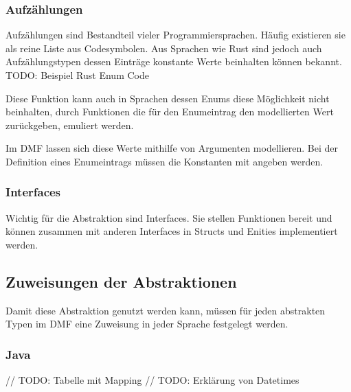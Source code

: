\documentclass[./einleitung.tex]{subfiles}
\begin{document}
\subsubsection{Aufzählungen}
Aufzählungen sind Bestandteil vieler Programmiersprachen. Häufig existieren sie als reine Liste  aus Codesymbolen. Aus Sprachen wie Rust sind jedoch auch Aufzählungstypen dessen Einträge konstante Werte beinhalten können bekannt.
TODO: Beispiel Rust Enum Code

Diese Funktion kann auch in Sprachen dessen Enums diese Möglichkeit nicht beinhalten, durch Funktionen die für den Enumeintrag den modellierten Wert zurückgeben, emuliert werden.

Im DMF lassen sich diese Werte mithilfe von Argumenten modellieren. Bei der Definition eines Enumeintrags müssen die Konstanten mit angeben werden.

\subsubsection{Interfaces}
Wichtig für die Abstraktion sind Interfaces. Sie stellen Funktionen bereit und können zusammen mit anderen Interfaces in Structs und Enities implementiert werden.


\subsection{Zuweisungen der Abstraktionen}

Damit diese Abstraktion genutzt werden kann, müssen für jeden abstrakten Typen im DMF eine Zuweisung in jeder Sprache festgelegt werden.

\subsubsection{Java}
// TODO: Tabelle mit Mapping
// TODO: Erklärung von Datetimes
\end{document}
